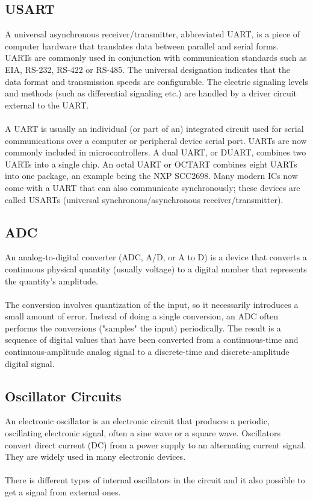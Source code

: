 \documentclass[english]{article}
\begin{document}
\subsection{USART}
A universal asynchronous receiver/transmitter, abbreviated UART, is a piece of computer hardware that translates data between parallel and serial forms. UARTs are commonly used in conjunction with communication standards such as EIA, RS-232, RS-422 or RS-485. The universal designation indicates that the data format and transmission speeds are configurable. The electric signaling levels and methods (such as differential signaling etc.) are handled by a driver circuit external to the UART.\\\\
A UART is usually an individual (or part of an) integrated circuit used for serial communications over a computer or peripheral device serial port. UARTs are now commonly included in microcontrollers. A dual UART, or DUART, combines two UARTs into a single chip. An octal UART or OCTART combines eight UARTs into one package, an example being the NXP SCC2698. Many modern ICs now come with a UART that can also communicate synchronously; these devices are called USARTs (universal synchronous/asynchronous receiver/transmitter).
\subsection{ADC}
An analog-to-digital converter (ADC, A/D, or A to D) is a device that converts a continuous physical quantity (usually voltage) to a digital number that represents the quantity's amplitude.\\\\
The conversion involves quantization of the input, so it necessarily introduces a small amount of error. Instead of doing a single conversion, an ADC often performs the conversions ("samples" the input) periodically. The result is a sequence of digital values that have been converted from a continuous-time and continuous-amplitude analog signal to a discrete-time and discrete-amplitude digital signal.
\subsection{Oscillator Circuits}
An electronic oscillator is an electronic circuit that produces a periodic, oscillating electronic signal, often a sine wave or a square wave. Oscillators convert direct current (DC) from a power supply to an alternating current signal. They are widely used in many electronic devices. \\\\
There is different types of internal oscillators in the circuit and it also possible to get a signal from external ones.
\end{document}
